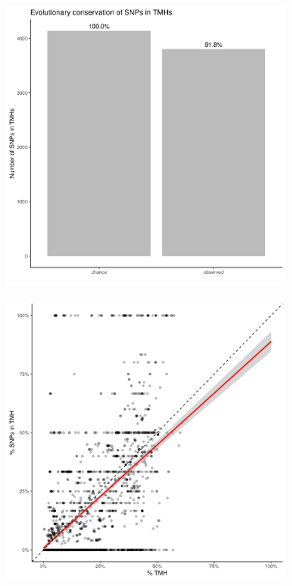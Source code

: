 \begin{figure}
  \centering
  \begin{subfigure}[t]{0.45\textwidth}
    \centering
    \caption{}
    \includegraphics[width=\linewidth]{ncbi_peregrine_results/fig_conservation.png}
    \label{fig:conservation}
  \end{subfigure}
  \hfill
  \begin{subfigure}[t]{0.45\textwidth}
    \centering
    \caption{}
    \includegraphics[width=\linewidth]{ncbi_peregrine_results/fig_f_snps_found_and_expected.png}
    \label{fig:f_snps_found_and_expected}
  \end{subfigure}
  

\end{figure}
